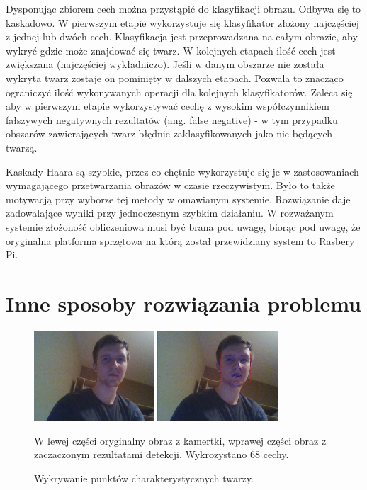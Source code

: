 \documentclass[oneside, eng]{mgr}
\begin{document}
Dysponując zbiorem cech można przystąpić do klasyfikacji obrazu. Odbywa się to kaskadowo. W pierwszym etapie wykorzystuje się klasyfikator złożony najczęściej z jednej lub dwóch cech. Klasyfikacja jest przeprowadzana na całym obrazie, aby wykryć gdzie może znajdować się twarz. W kolejnych etapach ilość cech jest zwiększana (najczęściej wykładniczo). Jeśli w danym obszarze nie została wykryta twarz zostaje on pominięty w dalszych etapach. Pozwala to znacząco ograniczyć ilość wykonywanych operacji dla kolejnych klasyfikatorów. Zaleca się aby w pierwszym etapie wykorzystywać cechę z wysokim współczynnikiem fałszywych negatywnych rezultatów (ang. false negative) - w tym przypadku obszarów zawierających twarz błędnie zaklasyfikowanych jako nie będących twarzą.

Kaskady Haara są szybkie, przez co chętnie wykorzystuje się je w zastosowaniach wymagającego przetwarzania obrazów w czasie rzeczywistym. Było to także motywacją przy wyborze tej metody w omawianym systemie. Rozwiązanie daje zadowalające wyniki przy jednoczesnym szybkim działaniu. W rozważanym systemie złożoność obliczeniowa musi być brana pod uwagę, biorąc pod uwagę, że oryginalna platforma sprzętowa na którą został przewidziany system to Rasbery Pi.

\section{Inne sposoby rozwiązania problemu} \label{geometrical_features}

\begin{figure}
\centering
	\includegraphics[width=0.40\textwidth,natwidth=310,natheight=642]{test.jpg}
	\includegraphics[width=0.40\textwidth,natwidth=310,natheight=642]{test_result.jpg}
\caption{Wykrywanie punktów charakterystycznych twarzy.}
W lewej części oryginalny obraz z kamertki, wprawej części obraz z zaczaczonym rezultatami detekcji. Wykrozystano 68 cechy.
	\label{fig:face_landmark_detect}
\end{figure}
\end{document}
